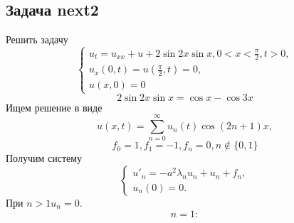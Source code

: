 \documentclass[11pt]{article}
\begin{document}
\subsection{Задача next2}
\label{sec:org98a023e}
Решить задачу
\begin{equation}
\begin{cases}
u_t = u_{xx} + u + 2\sin2x\sin x, 0 < x < \frac{\pi}2, t > 0, \\
u_x(0, t) = u\left(\frac{\pi}2, t\right) = 0, \\
u(x, 0) = 0
\end{cases}
\end{equation}
$$2\sin2x\sin x = \cos x - \cos3x$$
Ищем решение в виде
\begin{equation}
u(x, t) = \sum_{n = 0}^{\infty}u_n(t)\cos(2n + 1)x,
\end{equation}
$$f_0 = 1, f_1 = -1, f_n = 0, n \notin \{0, 1\}$$
Получим систему
\begin{equation}
\begin{cases}
u'_n = -a^2\lambda_nu_n + u_n + f_n, \\
u_n(0) = 0.
\end{cases}
\end{equation}
При $n > 1 u_n = 0$.
$$n = 1:$$
\end{document}
